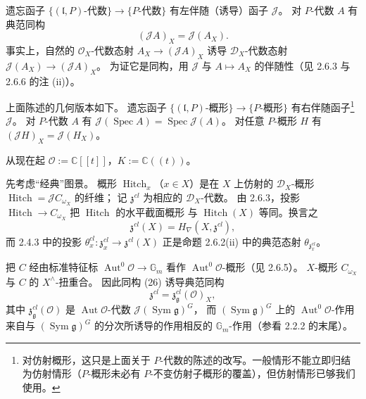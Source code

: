  遗忘函子 $\{(\mathfrak{l},P)\text{-代数}\}\to\{P\text{-代数}\}$
有左伴随（诱导）函子 $\mathcal{J}$。
对 $P$-代数 $A$ 有典范同构
\begin{equation}\tag{26}
(\mathcal{J}A)_X=\mathcal{J}(A_X).
\end{equation}
事实上，自然的 $\mathcal{O}_X$-代数态射 $A_X\to(\mathcal{J}A)_X$ 诱导
$\mathcal{D}_X$-代数态射 $\mathcal{J}(A_X)\to(\mathcal{J}A)_X$。
为证它是同构，用 $\mathcal{J}$ 与 $A\mapsto A_X$ 的伴随性（见 2.6.3 与 2.6.6 的注 (ii)）。

上面陈述的几何版本如下。
遗忘函子 $\{(\mathfrak{l},P)\text{-概形}\}\to\{P\text{-概形}\}$ 有右伴随函子\footnote{对仿射概形，这只是上面关于 $P$-代数的陈述的改写。一般情形不能立即归结为仿射情形（$P$-概形未必有 $P$-不变仿射子概形的覆盖），但仿射情形已够我们使用。} $\mathcal{J}$。
对 $P$-代数 $A$ 有 $\mathcal{J}(\operatorname{Spec} A)=\operatorname{Spec}\mathcal{J}(A)$。
对任意 $P$-概形 $H$ 有 $(\mathcal{J}H)_X=\mathcal{J}(H_X)$。

从现在起 $\mathcal{O}:=\mathbb{C}[[t]]$，$K:=\mathbb{C}((t))$。

 先考虑“经典”图景。
概形 $\operatorname{Hitch}_x$（$x\in X$）是在 $X$ 上仿射的 $\mathcal{D}_X$-概形
$\operatorname{Hitch}=\mathcal{J}C_{\omega_X}$ 的纤维；
记 $\mathfrak{z}^{cl}$ 为相应的 $\mathcal{D}_X$-代数。
由 2.6.3，投影 $\operatorname{Hitch}\to C_{\omega_X}$ 把 $\operatorname{Hitch}$ 的水平截面概形
与 $\operatorname{Hitch}(X)$ 等同。换言之
\[
\mathfrak{z}^{cl}(X)=H_\nabla(X,\mathfrak{z}^{cl}),
\]
而 2.4.3 中的投影 $\theta_x^{cl}: \mathfrak{z}_x^{cl}\to\mathfrak{z}^{cl}(X)$
正是命题 2.6.2(ii) 中的典范态射 $\theta_{\mathfrak{z}^{cl}_x}$。

把 $C$ 经由标准特征标 $\operatorname{Aut}^0\mathcal{O}\to\mathbb{G}_m$
看作 $\operatorname{Aut}^0\mathcal{O}$-概形（见 2.6.5）。
$X$-概形 $C_{\omega_X}$ 与 $C$ 的 $X^{\wedge}$-扭重合。
因此同构 (26) 诱导典范同构
\[
\mathfrak{z}^{cl}=\mathfrak{z}^{cl}_{\mathfrak{g}}(\mathcal{O})_X,
\]
其中 $\mathfrak{z}^{cl}_{\mathfrak{g}}(\mathcal{O})$ 是 $\operatorname{Aut}\mathcal{O}$-代数
$\mathcal{J}(\operatorname{Sym}\mathfrak{g})^G$，
而 $(\operatorname{Sym}\mathfrak{g})^G$ 上的 $\operatorname{Aut}^0\mathcal{O}$-作用
来自与 $(\operatorname{Sym}\mathfrak{g})^G$ 的分次所诱导的作用相反的 $\mathbb{G}_m$-作用（参看 2.2.2 的末尾）。

